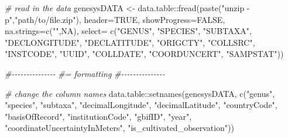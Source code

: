 \documentclass[
]{article}
\newenvironment{Shaded}{\begin{snugshade}}{\end{snugshade}}
\newcommand{\AttributeTok}[1]{\textcolor[rgb]{0.77,0.63,0.00}{#1}}
\newcommand{\CommentTok}[1]{\textcolor[rgb]{0.56,0.35,0.01}{\textit{#1}}}
\newcommand{\ConstantTok}[1]{\textcolor[rgb]{0.00,0.00,0.00}{#1}}
\newcommand{\FunctionTok}[1]{\textcolor[rgb]{0.00,0.00,0.00}{#1}}
\newcommand{\NormalTok}[1]{#1}
\newcommand{\OtherTok}[1]{\textcolor[rgb]{0.56,0.35,0.01}{#1}}
\newcommand{\SpecialCharTok}[1]{\textcolor[rgb]{0.00,0.00,0.00}{#1}}
\newcommand{\StringTok}[1]{\textcolor[rgb]{0.31,0.60,0.02}{#1}}
\begin{document}
\begin{Shaded}
\begin{Highlighting}[]

\CommentTok{\# read in the data}
\NormalTok{genesysDATA }\OtherTok{\textless{}{-}}\NormalTok{ data.table}\SpecialCharTok{::}\FunctionTok{fread}\NormalTok{(}\FunctionTok{paste}\NormalTok{(}\StringTok{"unzip {-}p"}\NormalTok{,}\StringTok{"path/to/file.zip"}\NormalTok{),}
                                     \AttributeTok{header=}\ConstantTok{TRUE}\NormalTok{,}
                                     \AttributeTok{showProgress=}\ConstantTok{FALSE}\NormalTok{,}
                                     \AttributeTok{na.strings=}\FunctionTok{c}\NormalTok{(}\StringTok{""}\NormalTok{,}\ConstantTok{NA}\NormalTok{),}
                                     \AttributeTok{select=} \FunctionTok{c}\NormalTok{(}\StringTok{"GENUS"}\NormalTok{,}
                                    \StringTok{"SPECIES"}\NormalTok{,}
                                    \StringTok{"SUBTAXA"}\NormalTok{,}
                                    \StringTok{"DECLONGITUDE"}\NormalTok{,}
                                    \StringTok{"DECLATITUDE"}\NormalTok{,}
                                    \StringTok{"ORIGCTY"}\NormalTok{,}
                                    \StringTok{"COLLSRC"}\NormalTok{,}
                                    \StringTok{"INSTCODE"}\NormalTok{,}
                                    \StringTok{"UUID"}\NormalTok{,}
                                    \StringTok{"COLLDATE"}\NormalTok{,}
                                    \StringTok{"COORDUNCERT"}\NormalTok{,}
                                    \StringTok{"SAMPSTAT"}\NormalTok{))}

\CommentTok{\#{-}{-}{-}{-}{-}{-}{-}{-}{-}{-}{-}{-}{-}{-}{-}}
\CommentTok{\#= formatting}
\CommentTok{\#{-}{-}{-}{-}{-}{-}{-}{-}{-}{-}{-}{-}{-}{-}{-}}

\CommentTok{\# change the column names}
\NormalTok{data.table}\SpecialCharTok{::}\FunctionTok{setnames}\NormalTok{(genesysDATA,}
                     \FunctionTok{c}\NormalTok{(}\StringTok{"genus"}\NormalTok{,}
                       \StringTok{"species"}\NormalTok{,}
                       \StringTok{"subtaxa"}\NormalTok{,}
                       \StringTok{"decimalLongitude"}\NormalTok{,}
                       \StringTok{"decimalLatitude"}\NormalTok{,}
                       \StringTok{"countryCode"}\NormalTok{,}
                       \StringTok{"basisOfRecord"}\NormalTok{,}
                       \StringTok{"institutionCode"}\NormalTok{,}
                       \StringTok{"gbifID"}\NormalTok{,}
                       \StringTok{"year"}\NormalTok{,}
                       \StringTok{"coordinateUncertaintyInMeters"}\NormalTok{,}
                       \StringTok{"is\_cultivated\_observation"}\NormalTok{))}


\end{Highlighting}
\end{Shaded}
\end{document}
